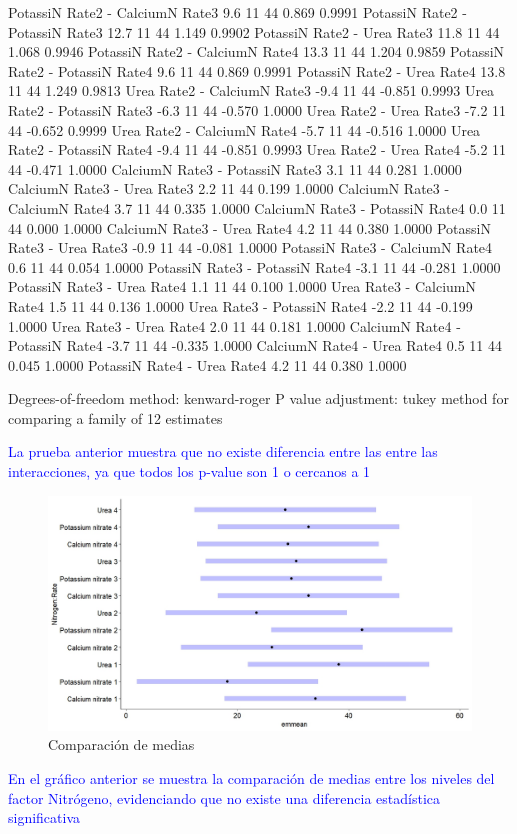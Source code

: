 \documentclass[a4paper,12pt]{article}
\begin{document}
\begin{enumerate}[label=\textbf{\alph*})]
\begin{MyVerbatim}
PotassiN Rate2 - CalciumN Rate3      9.6 11 44   0.869  0.9991
PotassiN Rate2 - PotassiN Rate3     12.7 11 44   1.149  0.9902
PotassiN Rate2 - Urea Rate3         11.8 11 44   1.068  0.9946
PotassiN Rate2 - CalciumN Rate4     13.3 11 44   1.204  0.9859
PotassiN Rate2 - PotassiN Rate4      9.6 11 44   0.869  0.9991
PotassiN Rate2 - Urea Rate4         13.8 11 44   1.249  0.9813
Urea Rate2 - CalciumN Rate3         -9.4 11 44  -0.851  0.9993
Urea Rate2 - PotassiN Rate3         -6.3 11 44  -0.570  1.0000
Urea Rate2 - Urea Rate3             -7.2 11 44  -0.652  0.9999
Urea Rate2 - CalciumN Rate4         -5.7 11 44  -0.516  1.0000
Urea Rate2 - PotassiN Rate4         -9.4 11 44  -0.851  0.9993
Urea Rate2 - Urea Rate4             -5.2 11 44  -0.471  1.0000
CalciumN Rate3 - PotassiN Rate3      3.1 11 44   0.281  1.0000
CalciumN Rate3 - Urea Rate3          2.2 11 44   0.199  1.0000
CalciumN Rate3 - CalciumN Rate4      3.7 11 44   0.335  1.0000
CalciumN Rate3 - PotassiN Rate4      0.0 11 44   0.000  1.0000
CalciumN Rate3 - Urea Rate4          4.2 11 44   0.380  1.0000
PotassiN Rate3 - Urea Rate3         -0.9 11 44  -0.081  1.0000
PotassiN Rate3 - CalciumN Rate4      0.6 11 44   0.054  1.0000
PotassiN Rate3 - PotassiN Rate4     -3.1 11 44  -0.281  1.0000
PotassiN Rate3 - Urea Rate4          1.1 11 44   0.100  1.0000
Urea Rate3 - CalciumN Rate4          1.5 11 44   0.136  1.0000
Urea Rate3 - PotassiN Rate4         -2.2 11 44  -0.199  1.0000
Urea Rate3 - Urea Rate4              2.0 11 44   0.181  1.0000
CalciumN Rate4 - PotassiN Rate4     -3.7 11 44  -0.335  1.0000
CalciumN Rate4 - Urea Rate4          0.5 11 44   0.045  1.0000
PotassiN Rate4 - Urea Rate4          4.2 11 44   0.380  1.0000

Degrees-of-freedom method: kenward-roger 
P value adjustment: tukey method for comparing a family of 12 estimates 
\end{MyVerbatim}
\textcolor{blue}{La prueba anterior muestra que no existe diferencia entre las entre las interacciones, ya que todos los p-value son 1 o cercanos a 1}
\begin{figure}[H]
	\centering
	\includegraphics[width=0.7\linewidth]{prob5_mediu}
	\caption[prob5_mediu]{Comparación de medias}
	\label{fig:prob5mediu}
\end{figure}

\textcolor{blue}{En el gráfico anterior se muestra la comparación de medias entre los niveles del factor Nitrógeno, evidenciando que no existe una diferencia estadística significativa}

	\end{enumerate}
\newpage
\end{document}
